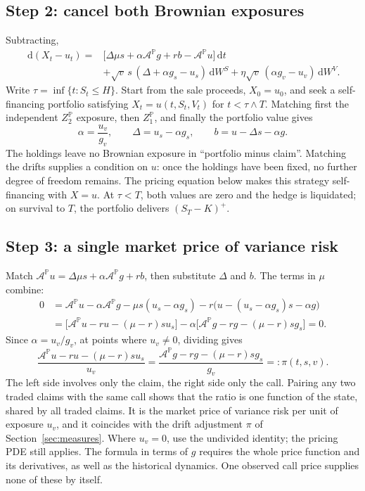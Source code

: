 \documentclass[10pt]{article}
\newcommand{\dd}{\,\mathrm d}\newcommand{\Pp}{\mathbb P}\newcommand{\Var}{\operatorname{Var}}\newcommand{\Cov}{\operatorname{Cov}}
\theoremstyle{definition}\newtheorem{definition}{Definition}[section]
\begin{document}
\subsection{Step 2: cancel both Brownian exposures}
Subtracting,
\[
\begin{aligned}
\dd(X_t-u_t)={}&\bigl[\Delta\mu s+\alpha\mathcal A^\Pp g+rb-\mathcal A^\Pp u\bigr]\dd t\\
&+\sqrt v\,s\,(\Delta+\alpha g_s-u_s)\dd W^S+\eta\sqrt v\,(\alpha g_v-u_v)\dd W^V.
\end{aligned}
\]
Write \(\tau=\inf\{t:S_t\le H\}\). Start from the sale proceeds, \(X_0=u_0\),
and seek a self-financing portfolio satisfying \(X_t=u(t,S_t,V_t)\) for
\(t<\tau\wedge T\). Matching first the independent \(Z_2^\Pp\) exposure,
then \(Z_1^\Pp\), and finally the portfolio value gives
\[
\boxed{\alpha=\frac{u_v}{g_v},\qquad\Delta=u_s-\alpha g_s,\qquad b=u-\Delta s-\alpha g.}
\]
The holdings leave no Brownian exposure in ``portfolio minus claim''.
Matching the drifts supplies a condition on \(u\): once the holdings have
been fixed, no further degree of freedom remains. The pricing equation below
makes this strategy self-financing with \(X=u\). At \(\tau<T\), both values
are zero and the hedge is liquidated; on survival to \(T\), the portfolio
delivers \((S_T-K)^+\).

\subsection{Step 3: a single market price of variance risk}
Match \(\mathcal A^\Pp u=\Delta\mu s+\alpha\mathcal A^\Pp g+rb\),
then substitute \(\Delta\) and \(b\). The terms in \(\mu\) combine:
\[
\begin{aligned}
0&=\mathcal A^\Pp u-\alpha\mathcal A^\Pp g-\mu s(u_s-\alpha g_s)
 -r\bigl(u-(u_s-\alpha g_s)s-\alpha g\bigr)\\
&=\bigl[\mathcal A^\Pp u-ru-(\mu-r)su_s\bigr]
 -\alpha\bigl[\mathcal A^\Pp g-rg-(\mu-r)sg_s\bigr]=0.
\end{aligned}
\]
Since \(\alpha=u_v/g_v\), at points where \(u_v\ne0\), dividing gives
\[
\boxed{\frac{\mathcal A^\Pp u-ru-(\mu-r)su_s}{u_v}
=\frac{\mathcal A^\Pp g-rg-(\mu-r)sg_s}{g_v}=:\pi(t,s,v).}
\]
The left side involves only the claim, the right side only the call. Pairing
any two traded claims with the same call shows that the ratio is one function
of the state, shared by all traded claims. It is the market price of variance
risk per unit of exposure \(u_v\), and it coincides with the drift adjustment
\(\pi\) of Section~\ref{sec:measures}. Where \(u_v=0\), use the undivided
identity; the pricing PDE still applies. The formula in terms of \(g\)
requires the whole price function and its derivatives, as well as the
historical dynamics. One observed call price supplies none of these by itself.
\end{document}
